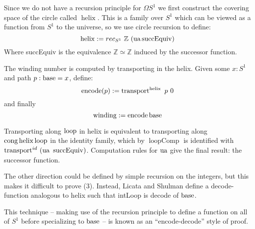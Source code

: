 Since we do not have a recursion principle for $\Omega S^1$ we first construct the
covering space of the circle called $\operatorname{helix}$. This is a family over $S^1$
which can be viewed as a function from $S^1$ to the universe, so we use circle
recursion to define:
\[
  \operatorname{helix} := rec_{S^1} ~ \mathbb{Z} ~ (\operatorname{ua} \operatorname{succEquiv})
\]
Where succEquiv is the equivalence $\mathbb{Z} \simeq \mathbb{Z}$ induced by the
successor function.

The winding number is computed by transporting in the helix. Given some $x:S^1$
and path $p : \operatorname{base} = x$, define:
\[
  \operatorname{encode}(p) := \operatorname{transport}^{\operatorname{helix}}~p~0
\]
and finally
\[
  \operatorname{winding} := \operatorname{encode} \operatorname{base}
\]

Transporting along $\operatorname{loop}$ in helix is equivalent to transporting along
$\operatorname{cong} \operatorname{helix} \operatorname{loop}$ in the identity family, which by $\operatorname{loopComp}$
is identified with $\operatorname{transport}^{id}~(\operatorname{ua}~\operatorname{succEquiv})$. Computation
rules for $\operatorname{ua}$ give the final result: the successor function.

The other direction could be defined by simple recursion on the integers, but
this makes it difficult to prove (3). Instead, Licata and Shulman define a
decode-function analogous to helix such that intLoop is decode of $\operatorname{base}$.

This technique -- making use of the recursion principle to define a function on
all of $S^1$ before specializing to $\operatorname{base}$ -- is known as an ``encode-decode''
style of proof.